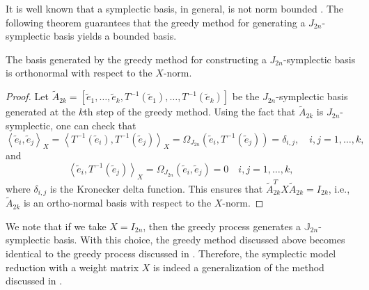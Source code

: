 It is well known that a symplectic basis, in general, is not norm bounded \cite{doi:10.1137/050628519}. The following theorem guarantees that the greedy method for generating a $J_{2n}$-symplectic basis yields a bounded basis.
\begin{theorem} \label{thm:3}
The basis generated by the greedy method for constructing a $J_{2n}$-symplectic basis is orthonormal with respect to the $X$-norm.
\end{theorem}
\begin{proof}
Let $\tilde A_{2k}=[\tilde e_1,\dots,\tilde e_k,T^{-1} (\tilde e_1),\dots,T^{-1}(\tilde e_k)]$ be the $J_{2n}$-symplectic basis generated at the $k$th step of the greedy method. Using the fact that $\tilde A_{2k}$ is $J_{2n}$-symplectic, one can check that
\begin{equation} \label{eq:normmor.12}
	\left\langle \tilde e_i, \tilde e_j\right\rangle_X = \left\langle T^{-1} ( \tilde e_i),T^{-1}( \tilde e_j)\right\rangle_X = \Omega_{J_{2n}}(\tilde e_i,T^{-1}(\tilde e_j))=\delta_{i,j}, \quad i,j=1,\dots,k,	
\end{equation}
and
\begin{equation} \label{eq:normmor.13}
	\left\langle \tilde e_i,T^{-1} (\tilde e_j) \right\rangle_X = \Omega_{J_{2n}}(\tilde e_i, \tilde e_j) = 0\quad i,j=1,\dots,k,
\end{equation}
where $\delta_{i,j}$ is the Kronecker delta function. This ensures that $\tilde A_{2k}^TX\tilde A_{2k} = I_{2k}$, i.e., $\tilde A_{2k}$ is an ortho-normal basis with respect to the $X$-norm.
\end{proof}
We note that if we take $X=I_{2n}$, then the greedy process generates a $\mathbb J_{2n}$- symplectic basis. With this choice, the greedy method discussed above becomes identical to the greedy process discussed in . Therefore, the symplectic model reduction with a weight matrix $X$ is indeed a generalization of the method discussed in .

